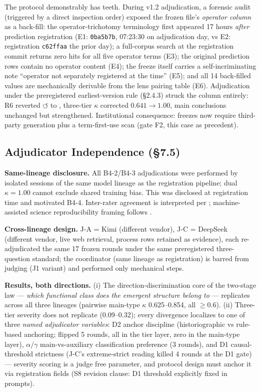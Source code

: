 The protocol demonstrably has teeth. During v1.2 adjudication, a
forensic audit (triggered by a direct inspection order) exposed the
frozen file's \emph{operator column} as a back-fill: the
operator-trichotomy terminology first appeared 17 hours
\emph{after} prediction registration (E1: \texttt{0ba5b7b},
07:23:30 on adjudication day, vs E2: registration
\texttt{c62ffaa} the prior day); a full-corpus search at the
registration commit returns zero hits for all five operator terms
(E3); the original prediction rows contain no operator content (E4);
the freeze itself carries a self-incriminating note ``operator not
separately registered at the time'' (E5); and all 14 back-filled
values are mechanically derivable from the lens pairing table (E6).
Adjudication under the preregistered earliest-version rule
(§2.4.3) struck the column entirely: R6 reverted $\circlearrowleft$
to \checkmark, three-tier $\kappa$ corrected $0.641 \to 1.00$, main
conclusions unchanged but strengthened. Institutional consequence:
freezes now require third-party generation plus a term-first-use
scan (gate F2, this case as precedent).

\subsection{Adjudicator Independence (\S7.5)}\label{sec:val-independence}

\textbf{Same-lineage disclosure.} All B4-2/B4-3 adjudications were
performed by isolated sessions of the same model lineage as the
registration pipeline; dual $\kappa=1.00$ cannot exclude shared
training bias. This was disclosed at registration time and motivated
B4-4. Inter-rater agreement is interpreted per
\citet{landis1977kappa}; machine-assisted science reproducibility
framing follows \citet{kapoor2023leakage}.

\textbf{Cross-lineage design.} J-A = Kimi (different vendor), J-C =
DeepSeek (different vendor, live web retrieval, process rows
retained as evidence), each re-adjudicated the same 17 frozen rounds
under the same preregistered three-question standard; the
coordinator (same lineage as registration) is barred from judging
(J1 variant) and performed only mechanical steps.

\textbf{Results, both directions.} (i) The direction-discrimination
core of the two-stage law --- \emph{which functional class does the
emergent structure belong to} --- replicates across all three
lineages (pairwise main-type $\kappa$ 0.625--0.854, all
$\ge$0.6). (ii) Three-tier severity does not replicate (0.09--0.32);
every divergence localizes to one of three \emph{named adjudicator
variables}: D2 anchor discipline (historiographic vs rule-based
anchoring; flipped 5 rounds, all in the tier layer, zero in the
main-type layer), $\alpha/\gamma$ main-vs-auxiliary classification
preference (3 rounds), and D1 causal-threshold strictness (J-C's
extreme-strict reading killed 4 rounds at the D1 gate) ---
severity scoring is a judge free parameter, and protocol design must
anchor it via registration fields (S8 revision clause: D1 threshold
explicitly fixed in prompts).

